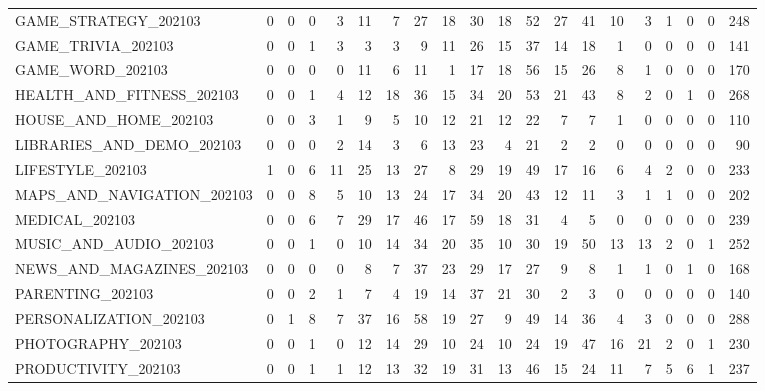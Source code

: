 \begin{tabular}{lrrrrrrrrrrrrrrrrrrr}
GAME\_STRATEGY\_202103       &  0 &  0 &  0 &  3 &  11 &  7 &  27 &  18 &  30 &  18 &  52 &  27 &  41 &  10 &  3 &  1 &  0 &  0 &  248 \\
GAME\_TRIVIA\_202103         &  0 &  0 &  1 &  3 &  3 &  3 &  9 &  11 &  26 &  15 &  37 &  14 &  18 &  1 &  0 &  0 &  0 &  0 &  141 \\
GAME\_WORD\_202103           &  0 &  0 &  0 &  0 &  11 &  6 &  11 &  1 &  17 &  18 &  56 &  15 &  26 &  8 &  1 &  0 &  0 &  0 &  170 \\
HEALTH\_AND\_FITNESS\_202103  &  0 &  0 &  1 &  4 &  12 &  18 &  36 &  15 &  34 &  20 &  53 &  21 &  43 &  8 &  2 &  0 &  1 &  0 &  268 \\
HOUSE\_AND\_HOME\_202103      &  0 &  0 &  3 &  1 &  9 &  5 &  10 &  12 &  21 &  12 &  22 &  7 &  7 &  1 &  0 &  0 &  0 &  0 &  110 \\
LIBRARIES\_AND\_DEMO\_202103  &  0 &  0 &  0 &  2 &  14 &  3 &  6 &  13 &  23 &  4 &  21 &  2 &  2 &  0 &  0 &  0 &  0 &  0 &  90 \\
LIFESTYLE\_202103           &  1 &  0 &  6 &  11 &  25 &  13 &  27 &  8 &  29 &  19 &  49 &  17 &  16 &  6 &  4 &  2 &  0 &  0 &  233 \\
MAPS\_AND\_NAVIGATION\_202103 &  0 &  0 &  8 &  5 &  10 &  13 &  24 &  17 &  34 &  20 &  43 &  12 &  11 &  3 &  1 &  1 &  0 &  0 &  202 \\
MEDICAL\_202103             &  0 &  0 &  6 &  7 &  29 &  17 &  46 &  17 &  59 &  18 &  31 &  4 &  5 &  0 &  0 &  0 &  0 &  0 &  239 \\
MUSIC\_AND\_AUDIO\_202103     &  0 &  0 &  1 &  0 &  10 &  14 &  34 &  20 &  35 &  10 &  30 &  19 &  50 &  13 &  13 &  2 &  0 &  1 &  252 \\
NEWS\_AND\_MAGAZINES\_202103  &  0 &  0 &  0 &  0 &  8 &  7 &  37 &  23 &  29 &  17 &  27 &  9 &  8 &  1 &  1 &  0 &  1 &  0 &  168 \\
PARENTING\_202103           &  0 &  0 &  2 &  1 &  7 &  4 &  19 &  14 &  37 &  21 &  30 &  2 &  3 &  0 &  0 &  0 &  0 &  0 &  140 \\
PERSONALIZATION\_202103     &  0 &  1 &  8 &  7 &  37 &  16 &  58 &  19 &  27 &  9 &  49 &  14 &  36 &  4 &  3 &  0 &  0 &  0 &  288 \\
PHOTOGRAPHY\_202103         &  0 &  0 &  1 &  0 &  12 &  14 &  29 &  10 &  24 &  10 &  24 &  19 &  47 &  16 &  21 &  2 &  0 &  1 &  230 \\
PRODUCTIVITY\_202103        &  0 &  0 &  1 &  1 &  12 &  13 &  32 &  19 &  31 &  13 &  46 &  15 &  24 &  11 &  7 &  5 &  6 &  1 &  237 \\

\end{tabular}
